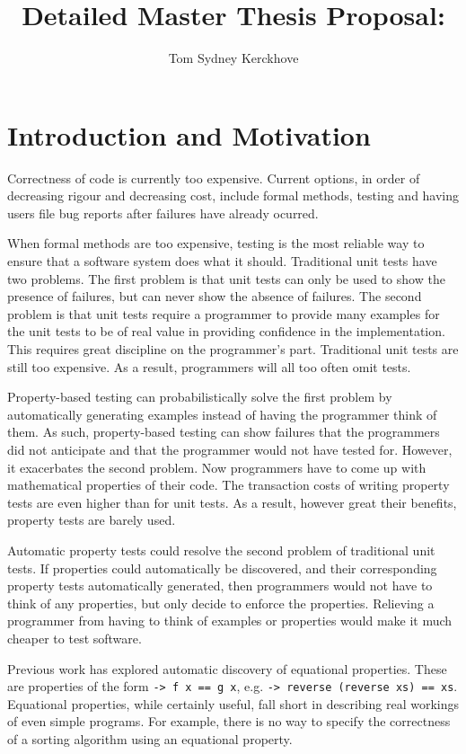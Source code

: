 \documentclass[a4paper, 11pt]{article}
\title{Detailed Master Thesis Proposal:\\\vspace{0.5cm}{\Huge Functional Property Discovery and Corresponding Test Generation in Haskell}}
\author{Tom Sydney Kerckhove}
\begin{document}
\maketitle

\section{Introduction and Motivation}


Correctness of code is currently too expensive.
Current options, in order of decreasing rigour and decreasing cost, include formal methods, testing and having users file bug reports after failures have already ocurred.

When formal methods are too expensive, testing is the most reliable way to ensure that a software system does what it should.
Traditional unit tests have two problems.
The first problem is that unit tests can only be used to show the presence of failures, but can never show the absence of failures.
The second problem is that unit tests require a programmer to provide many examples for the unit tests to be of real value in providing confidence in the implementation.
This requires great discipline on the programmer's part.
Traditional unit tests are still too expensive.
As a result, programmers will all too often omit tests.

Property-based testing \cite{QuickCheck} can probabilistically solve the first problem by automatically generating examples instead of having the programmer think of them.
As such, property-based testing can show failures that the programmers did not anticipate and that the programmer would not have tested for.
However, it exacerbates the second problem.
Now programmers have to come up with mathematical properties of their code.
The transaction costs of writing property tests are even higher than for unit tests.
As a result, however great their benefits, property tests are barely used.

Automatic property tests could resolve the second problem of traditional unit tests.
If properties could automatically be discovered, and their corresponding property tests automatically generated, then programmers would not have to think of any properties, but only decide to enforce the properties.
Relieving a programmer from having to think of examples or properties would make it much cheaper to test software.

Previous work \cite{QuickSpec} has explored automatic discovery of equational properties.
These are properties of the form \texttt{\x -> f x == g x}, e.g. \texttt{\xs -> reverse (reverse xs) == xs}.
Equational properties, while certainly useful, fall short in describing real workings of even simple programs.
For example, there is no way to specify the correctness of a sorting algorithm using an equational property.
\end{document}
